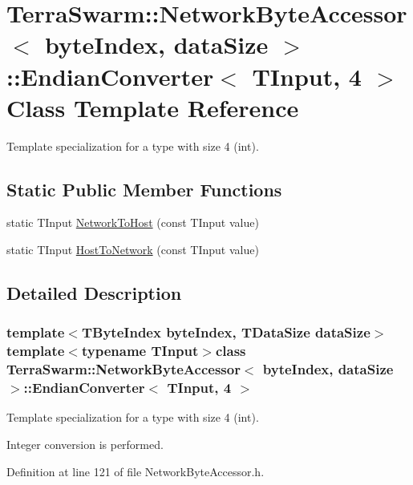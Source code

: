 \hypertarget{class_terra_swarm_1_1_network_byte_accessor_1_1_endian_converter_3_01_t_input_00_014_01_4}{\section{Terra\-Swarm\-:\-:Network\-Byte\-Accessor$<$ byte\-Index, data\-Size $>$\-:\-:Endian\-Converter$<$ T\-Input, 4 $>$ Class Template Reference}
\label{class_terra_swarm_1_1_network_byte_accessor_1_1_endian_converter_3_01_t_input_00_014_01_4}
}


Template specialization for a type with size 4 (int).  


\subsection*{Static Public Member Functions}
\begin{DoxyCompactItemize}
\item 
static T\-Input \hyperlink{class_terra_swarm_1_1_network_byte_accessor_1_1_endian_converter_3_01_t_input_00_014_01_4_a542049145a0bcbc72d993b62b196ad7d}{Network\-To\-Host} (const T\-Input value)
\item 
static T\-Input \hyperlink{class_terra_swarm_1_1_network_byte_accessor_1_1_endian_converter_3_01_t_input_00_014_01_4_a89edac80d0e755c13fe6b661d537a0fd}{Host\-To\-Network} (const T\-Input value)
\end{DoxyCompactItemize}


\subsection{Detailed Description}
\subsubsection*{template$<$T\-Byte\-Index byte\-Index, T\-Data\-Size data\-Size$>$template$<$typename T\-Input$>$class Terra\-Swarm\-::\-Network\-Byte\-Accessor$<$ byte\-Index, data\-Size $>$\-::\-Endian\-Converter$<$ T\-Input, 4 $>$}

Template specialization for a type with size 4 (int). 

Integer conversion is performed. 

Definition at line 121 of file Network\-Byte\-Accessor.\-h.



